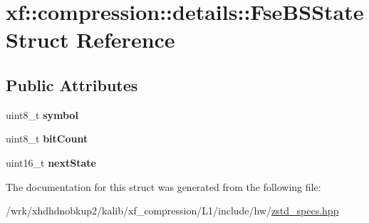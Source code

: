\hypertarget{structxf_1_1compression_1_1details_1_1FseBSState}{\section{xf\-:\-:compression\-:\-:details\-:\-:Fse\-B\-S\-State Struct Reference}
\label{structxf_1_1compression_1_1details_1_1FseBSState}
}
\subsection*{Public Attributes}
\begin{DoxyCompactItemize}
\item 
\hypertarget{structxf_1_1compression_1_1details_1_1FseBSState_a9d488289f66782dd34b217c4bd0e69f3}{uint8\-\_\-t {\bfseries symbol}}\label{structxf_1_1compression_1_1details_1_1FseBSState_a9d488289f66782dd34b217c4bd0e69f3}

\item 
\hypertarget{structxf_1_1compression_1_1details_1_1FseBSState_a8684516bd49a1fbcf9472100e044648c}{uint8\-\_\-t {\bfseries bit\-Count}}\label{structxf_1_1compression_1_1details_1_1FseBSState_a8684516bd49a1fbcf9472100e044648c}

\item 
\hypertarget{structxf_1_1compression_1_1details_1_1FseBSState_aeb57ea51030f2185be44284aa5d0e045}{uint16\-\_\-t {\bfseries next\-State}}\label{structxf_1_1compression_1_1details_1_1FseBSState_aeb57ea51030f2185be44284aa5d0e045}

\end{DoxyCompactItemize}


The documentation for this struct was generated from the following file\-:\begin{DoxyCompactItemize}
\item 
/wrk/xhdhdnobkup2/kalib/xf\-\_\-compression/\-L1/include/hw/\hyperlink{zstd__specs_8hpp}{zstd\-\_\-specs.\-hpp}\end{DoxyCompactItemize}
